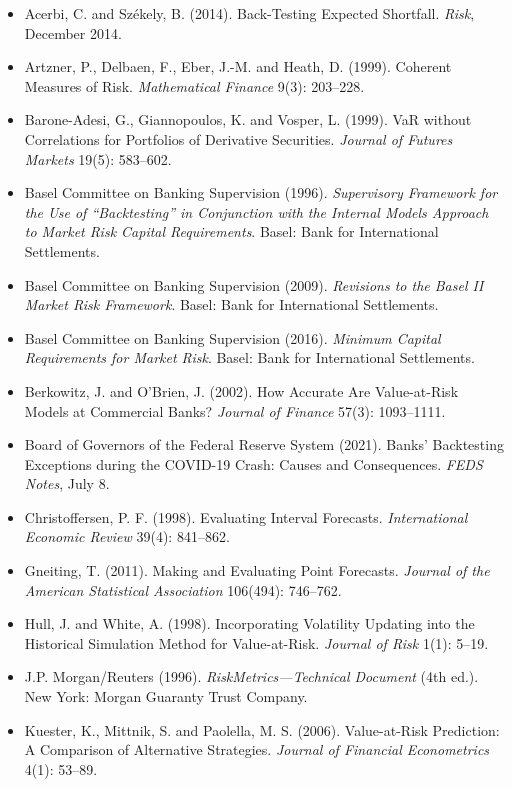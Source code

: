 \begin{itemize}
  \item Acerbi, C. and Sz\'ekely, B. (2014). Back-Testing Expected Shortfall. \emph{Risk}, December 2014.
  \item Artzner, P., Delbaen, F., Eber, J.-M. and Heath, D. (1999). Coherent Measures of Risk. \emph{Mathematical Finance} 9(3): 203--228.
  \item Barone-Adesi, G., Giannopoulos, K. and Vosper, L. (1999). VaR without Correlations for Portfolios of Derivative Securities. \emph{Journal of Futures Markets} 19(5): 583--602.
  \item Basel Committee on Banking Supervision (1996). \emph{Supervisory Framework for the Use of ``Backtesting'' in Conjunction with the Internal Models Approach to Market Risk Capital Requirements}. Basel: Bank for International Settlements.
  \item Basel Committee on Banking Supervision (2009). \emph{Revisions to the Basel II Market Risk Framework}. Basel: Bank for International Settlements.
  \item Basel Committee on Banking Supervision (2016). \emph{Minimum Capital Requirements for Market Risk}. Basel: Bank for International Settlements.
  \item Berkowitz, J. and O'Brien, J. (2002). How Accurate Are Value-at-Risk Models at Commercial Banks? \emph{Journal of Finance} 57(3): 1093--1111.
  \item Board of Governors of the Federal Reserve System (2021). Banks' Backtesting Exceptions during the COVID-19 Crash: Causes and Consequences. \emph{FEDS Notes}, July 8.
  \item Christoffersen, P. F. (1998). Evaluating Interval Forecasts. \emph{International Economic Review} 39(4): 841--862.
  \item Gneiting, T. (2011). Making and Evaluating Point Forecasts. \emph{Journal of the American Statistical Association} 106(494): 746--762.
  \item Hull, J. and White, A. (1998). Incorporating Volatility Updating into the Historical Simulation Method for Value-at-Risk. \emph{Journal of Risk} 1(1): 5--19.
  \item J.P. Morgan/Reuters (1996). \emph{RiskMetrics---Technical Document} (4th ed.). New York: Morgan Guaranty Trust Company.
  \item Kuester, K., Mittnik, S. and Paolella, M. S. (2006). Value-at-Risk Prediction: A Comparison of Alternative Strategies. \emph{Journal of Financial Econometrics} 4(1): 53--89.

\end{itemize}

